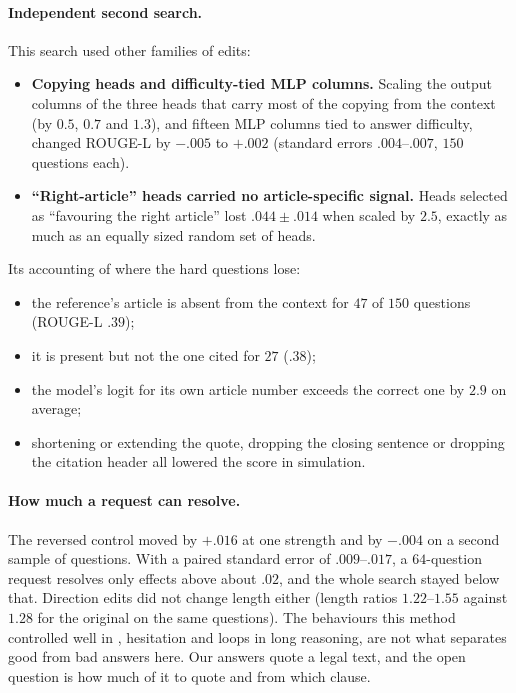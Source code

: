 \documentclass[11pt,a4paper]{article}
\newcommand{\rl}{ROUGE-L}
\begin{document}
\paragraph{Independent second search.} This search used other families of edits:
\begin{itemize}[leftmargin=*]
\item \textbf{Copying heads and difficulty-tied MLP columns.} Scaling the output columns of the three heads that carry most of the copying from the context (by $0.5$, $0.7$ and $1.3$), and fifteen MLP columns tied to answer difficulty, changed \rl{} by $-.005$ to $+.002$ (standard errors $.004$--$.007$, $150$ questions each).
\item \textbf{``Right-article'' heads carried no article-specific signal.} Heads selected as ``favouring the right article'' lost $.044\pm.014$ when scaled by $2.5$, exactly as much as an equally sized random set of heads.
\end{itemize}
Its accounting of where the hard questions lose:
\begin{itemize}[leftmargin=*]
\item the reference's article is absent from the context for $47$ of $150$ questions (\rl{} $.39$);
\item it is present but not the one cited for $27$ ($.38$);
\item the model's logit for its own article number exceeds the correct one by $2.9$ on average;
\item shortening or extending the quote, dropping the closing sentence or dropping the citation header all lowered the score in simulation.
\end{itemize}

\paragraph{How much a request can resolve.} The reversed control moved by $+.016$ at one strength and by $-.004$ on a second sample of questions. With a paired standard error of $.009$--$.017$, a $64$-question request resolves only effects above about $.02$, and the whole search stayed below that. Direction edits did not change length either (length ratios $1.22$--$1.55$ against $1.28$ for the original on the same questions). The behaviours this method controlled well in \cite{wsp}, hesitation and loops in long reasoning, are not what separates good from bad answers here. Our answers quote a legal text, and the open question is how much of it to quote and from which clause.
\end{document}
